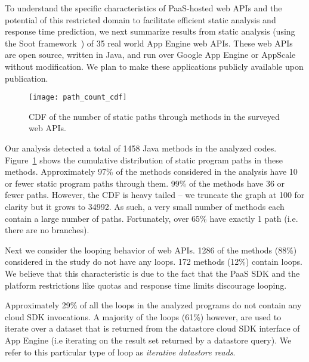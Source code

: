 
To understand the specific characteristics of PaaS-hosted web APIs and the potential
of this restricted domain to facilitate efficient static analysis and response time 
prediction,  we next summarize results from static analysis (using the Soot
framework~\cite{Vallee-Rai:2010:SJB:1925805.1925818}) of 
35 real world App Engine web APIs. These web APIs are open 
source, written in Java, and run over Google App Engine or AppScale without modification.
We plan to make these applications publicly available upon publication.  

\begin{figure}
\centering
\texttt{[image: path\_count\_cdf]}
\caption{CDF of the number of static paths through methods in the surveyed web APIs.
\label{fig:path_count_cdf}
}
\vspace{-0.2in}
\end{figure}

Our analysis detected a total of 1458 Java methods in the analyzed codes.
Figure~\ref{fig:path_count_cdf} shows the cumulative distribution of 
static program paths in these methods.
Approximately 97\% of the methods considered in the analysis have 10 or fewer 
static program paths through them.  99\% of 
the methods have 36 or fewer paths.
However, the CDF is heavy tailed --
we truncate the graph at 100 for clarity but it grows to 34992. As such, 
a very small number of methods 
each contain a large number of paths.
Fortunately, over 65\% have exactly 1 path (i.e. there are no branches).

Next we consider the looping behavior of web APIs.  1286 of the methods (88\%)
considered in the study
do not have any loops. 172 methods (12\%) contain loops. 
We believe that this characteristic is due to the fact that 
the PaaS SDK and the platform restrictions like quotas and response time limits 
discourage looping.

Approximately 29\% of all the loops in 
the analyzed programs do not contain any cloud SDK invocations. 
A majority of the loops (61\%) however, are
used to iterate over a dataset that is returned from the datastore cloud SDK interface 
of App Engine (i.e iterating on the result set 
returned by a datastore query). We refer to this particular type of 
loop as \textit{iterative datastore reads}. 

